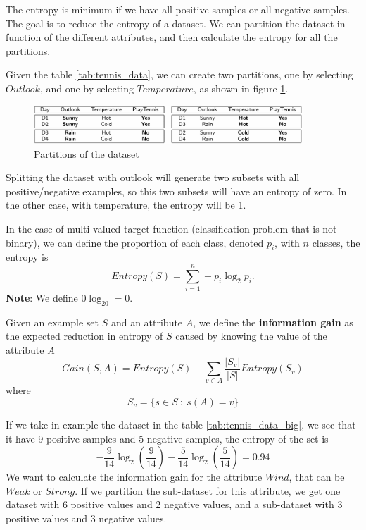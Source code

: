 \documentclass[10pt, letterpaper]{report}
\begin{document}
The entropy is minimum if we have all positive samples or all negative samples. The goal is to reduce the entropy of a dataset. We can partition the dataset in function of the different attributes, and then calculate the entropy for all the partitions. \bigskip

Given the table \ref{tab:tennis_data}, we can create two partitions, one by selecting $Outlook$, and one by selecting $Temperature$, as shown in figure \ref{img:partitions}.

\begin{figure}[h!]
    \centering
    \includegraphics[width=0.9\textwidth]{images/partitions.png}
    \caption{Partitions of the dataset}
    \label{img:partitions}
\end{figure}

Splitting the dataset with outlook will generate two subsets with all positive/negative examples, so this two subsets will have an entropy of zero. In the other case, with temperature, the entropy will be 1.\bigskip

\noindent In the case of multi-valued target function (classification problem that is not binary), we can define the proportion of each class, denoted $p_i$, with $n$ classes, the entropy is\begin{equation}
    Entropy(S)=\sum_{i=1}^n-p_i\log_2p_i.
\end{equation}
\textbf{Note}: We define $0\log_20=0$.
\begin{definition}
    Given an example set $S$ and an attribute $A$, we define the \textbf{information gain} as the expected reduction in entropy of $S$ caused by knowing the value of the attribute $A$\begin{equation}
        Gain(S,A)=Entropy(S)-\sum_{v\in A}\frac{|S_v|}{|S|}Entropy(S_v)
    \end{equation}
    where\begin{equation}
        S_v=\{s\in S \ : \ s(A)=v\}
    \end{equation}
\end{definition}

If we take in example the dataset in the table \ref{tab:tennis_data_big}, we see that it have 9 positive samples and 5 negative samples, the entropy of the set is \begin{equation}
    -\frac{9}{14}\log_2\left(\frac{9}{14}\right)-\frac{5}{14}\log_2\left(\frac{5}{14}\right)=0.94   
\end{equation}
We want to calculate the information gain for the attribute $Wind$, that can be $Weak$ or $Strong$. If we partition the sub-dataset for this attribute, we get one dataset with 6 positive values and 2 negative values, and a sub-dataset with 3 positive values and 3 negative values.
\end{document}
